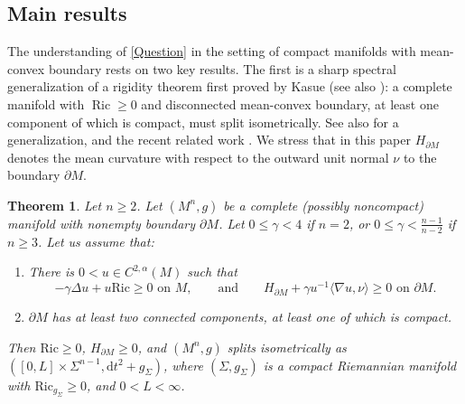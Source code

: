 \documentclass[12pt,a4paper,reqno]{amsart}
\newtheorem{theorem}{Theorem}
\theoremstyle{definition}
\renewcommand{\leq}{\leqslant}
\renewcommand{\geq}{\geqslant}
\DeclareMathOperator{\Ric}{Ric}
\begin{document}
\subsection{Main results}
The understanding of \cref{Question} in the setting of compact manifolds with mean-convex boundary rests on two key results. The first is a sharp spectral generalization of a rigidity theorem first proved
by Kasue \cite[Theorem B(1)]{Kasue83} (see also \cite{MR649619}): a complete manifold with $\Ric\geq0$ and disconnected
mean-convex boundary, at least one component of which is compact, must split
isometrically.  See also \cite{CrokeKleiner} for a generalization, and the recent related work \cite{CucinottaMondino}. We stress that in this paper $H_{\partial M}$ denotes the mean curvature with respect to the outward unit normal $\nu$ to the boundary $\partial M$.
\begin{theorem}\label{thmSplitting}
    Let $n\geq 2$. Let $(M^n,g)$ be a complete (possibly noncompact) manifold with nonempty boundary $\partial M$. Let $0\leq \gamma<4$ if $n=2$, or $0\leq \gamma<\frac{n-1}{n-2}$ if $n\geq 3$. Let us assume that:
    \begin{enumerate}
        \item There is $0<u\in C^{2,\alpha}(M)$ such that 
        \begin{equation}\label{eqn:TwoAssumptions}
        -\gamma\Delta u+u\mathrm{Ric}\geq 0\,\, \text{on $M$}, \qquad \text{and} \qquad H_{\partial M}+\gamma u^{-1}\langle \nabla u,\nu\rangle \geq 0\,\, \text{on $\partial M$}.
        \end{equation}
        \item $\partial M$ has at least two connected components, at least one of which is compact.
    \end{enumerate}
    Then $\mathrm{Ric}\geq 0$, $H_{\partial M}\geq 0$, and $(M^n,g)$ splits isometrically as $([0,L]\times \Sigma^{n-1},\mathrm{d}t^2+g_\Sigma)$, where $(\Sigma,g_\Sigma)$ is a compact Riemannian manifold with $\mathrm{Ric}_{g_\Sigma}\geq 0$, and $0<L<\infty$.
\end{theorem}
\end{document}
